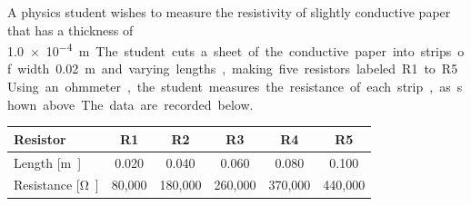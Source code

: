 \documentclass{../../../oss-apphys-exam}
\begin{document}
\begin{questions}
  \newpage

  
  \question A physics student wishes to measure the resistivity of slightly
  conductive paper that has a thickness of \SI{1.0e-4}\metre. The student cuts
  a sheet of the conductive paper into strips of width \SI{.02}{\metre} and
  varying lengths, making five resistors labeled R1 to R5. Using an ohmmeter,
  the student measures the resistance of each strip, as shown above. The data
  are recorded below.
  \begin{center}
    \begin{tabular}{|l|c|c|c|c|c|}
      \hline
      Resistor & R1 & R2 & R3 & R4 & R5 \\ \hline
      Length [\si\metre] & 0.020 & 0.040 & 0.060 & 0.080 & 0.100\\ \hline
      Resistance [\si\ohm] & 80,000 & 180,000 & 260,000 & 370,000 & 440,000\\
      \hline
    \end{tabular}
  \end{center}
\end{questions}
\end{document}
